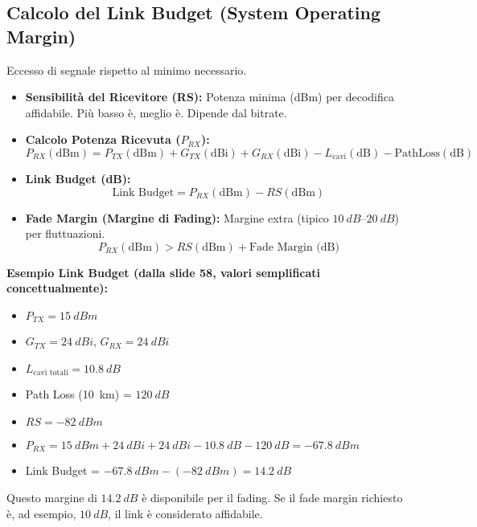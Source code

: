 \documentclass{article}
\begin{document}
\subsection{Calcolo del Link Budget (System Operating Margin)}
Eccesso di segnale rispetto al minimo necessario.
\begin{itemize}
    \item \textbf{Sensibilità del Ricevitore (RS):} Potenza minima (dBm) per decodifica affidabile. Più basso è, meglio è. Dipende dal bitrate.
    \item \textbf{Calcolo Potenza Ricevuta ($P_{RX}$):}
    \[ P_{RX} (\text{dBm}) = P_{TX} (\text{dBm}) + G_{TX} (\text{dBi}) + G_{RX} (\text{dBi}) - L_{\text{cavi}} (\text{dB}) - \text{PathLoss} (\text{dB}) \]
    \item \textbf{Link Budget (dB):}
    \[ \text{Link Budget} = P_{RX} (\text{dBm}) - RS (\text{dBm}) \]
    \item \textbf{Fade Margin (Margine di Fading):} Margine extra (tipico $\SIrange{+10}{+20}{dB}$) per fluttuazioni.
    \[ P_{RX} (\text{dBm}) > RS (\text{dBm}) + \text{Fade Margin (dB)} \]
\end{itemize}
\textbf{Esempio Link Budget (dalla slide 58, valori semplificati concettualmente):}
\begin{itemize}
    \item $P_{TX} = \SI{+15}{dBm}$
    \item $G_{TX} = \SI{+24}{dBi}$, $G_{RX} = \SI{+24}{dBi}$
    \item $L_{\text{cavi totali}} = \SI{10.8}{dB}$
    \item Path Loss (\SI{10}{km}) = $\SI{120}{dB}$
    \item $RS = \SI{-82}{dBm}$
    \item $P_{RX} = \SI{15}{dBm} + \SI{24}{dBi} + \SI{24}{dBi} - \SI{10.8}{dB} - \SI{120}{dB} = \SI{-67.8}{dBm}$
    \item Link Budget = $\SI{-67.8}{dBm} - (\SI{-82}{dBm}) = \SI{+14.2}{dB}$
\end{itemize}
Questo margine di $\SI{14.2}{dB}$ è disponibile per il fading. Se il fade margin richiesto è, ad esempio, $\SI{10}{dB}$, il link è considerato affidabile.
\end{document}
